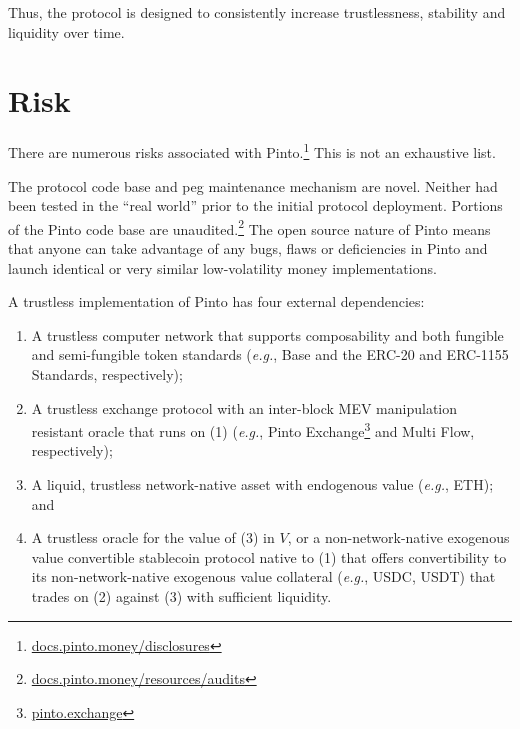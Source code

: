 \documentclass[tikz]{article}
\newcommand{\fref}[1]{\footnote{\href{http://#1}{#1}}}
\begin{document}
\vspace{-0.15cm}

Thus, the protocol is designed to consistently increase trustlessness, stability and liquidity over time.


\vspace{-0.15cm}
\section{Risk}
\vspace{-0.15cm}

There are numerous risks associated with Pinto.\fref{docs.pinto.money/disclosures} This is not an exhaustive list.

\vspace{-0.15cm}

The protocol code base and peg maintenance mechanism are novel. Neither had been tested in the “real world” prior to the initial protocol deployment. Portions of the Pinto code base are unaudited.\footnote{\href{https://docs.pinto.money/resources/audits}{docs.pinto.money/resources/audits}} The open source nature of Pinto means that anyone can take advantage of any bugs, flaws or deficiencies in Pinto and launch identical or very similar low-volatility money implementations.

\vspace{-0.15cm}

A trustless implementation of Pinto has four external dependencies:

\begin{enumerate}[label=(\arabic*)]
    \item A trustless computer network that supports composability and both fungible and semi-fungible token standards (\textit{e.g.}, Base and the ERC-20 and ERC-1155 Standards, respectively);
    \item A trustless exchange protocol with an inter-block MEV manipulation resistant oracle that runs on (1) (\textit{e.g.}, Pinto Exchange\fref{pinto.exchange} and Multi Flow, respectively); 
    \item A liquid, trustless network-native asset with endogenous value (\textit{e.g.}, ETH); and
    \item A trustless oracle for the value of (3) in $V$, or a non-network-native exogenous value convertible stablecoin protocol native to (1) that offers convertibility to its non-network-native exogenous value collateral (\textit{e.g.}, USDC, USDT) that trades on (2) against (3) with sufficient liquidity.
\end{enumerate}
\end{document}
